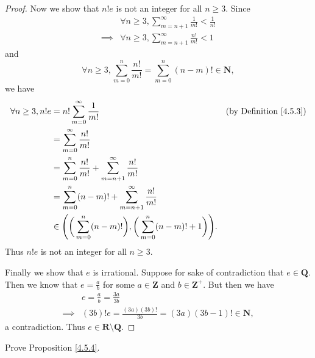 \begin{proof}
    Now we show that \(n! e\) is not an integer for all \(n \geq 3\).
    Since
    \begin{align*}
                 & \forall n \geq 3, \sum_{m = n + 1}^\infty \frac{1}{m!} < \frac{1}{n!} \\
        \implies & \forall n \geq 3, \sum_{m = n + 1}^\infty \frac{n!}{m!} < 1
    \end{align*}
    and
    \[
        \forall n \geq 3, \sum_{m = 0}^n \frac{n!}{m!} = \sum_{m = 0}^n (n - m)! \in \mathbf{N},
    \]
    we have
    \begin{align*}
        \forall n \geq 3, n! e & = n! \sum_{m = 0}^\infty \frac{1}{m!}                                                         & \text{(by Definition \ref{4.5.3})} \\
                               & = \sum_{m = 0}^\infty \frac{n!}{m!}                                                                                                \\
                               & = \sum_{m = 0}^n \frac{n!}{m!} + \sum_{m = n + 1}^\infty \frac{n!}{m!}                                                             \\
                               & = \sum_{m = 0}^n (n - m)! + \sum_{m = n + 1}^\infty \frac{n!}{m!}                                                                  \\
                               & \in \Bigg(\bigg(\sum_{m = 0}^n (n - m)!\bigg), \bigg(\sum_{m = 0}^n (n - m)! + 1\bigg)\Bigg).
    \end{align*}
    Thus \(n! e\) is not an integer for all \(n \geq 3\).

    Finally we show that \(e\) is irrational.
    Suppose for sake of contradiction that \(e \in \mathbf{Q}\).
    Then we know that \(e = \frac{a}{b}\) for some \(a \in \mathbf{Z}\) and \(b \in \mathbf{Z}^+\).
    But then we have
    \begin{align*}
                 & e = \frac{a}{b} = \frac{3a}{3b}                                  \\
        \implies & (3b)! e = \frac{(3a) (3b)!}{3b} = (3a) (3b - 1)! \in \mathbf{N},
    \end{align*}
    a contradiction.
    Thus \(e \in \mathbf{R} \setminus \mathbf{Q}\).
\end{proof}

\begin{exercise}\label{ex 4.5.3}
    Prove Proposition \ref{4.5.4}.
\end{exercise}

